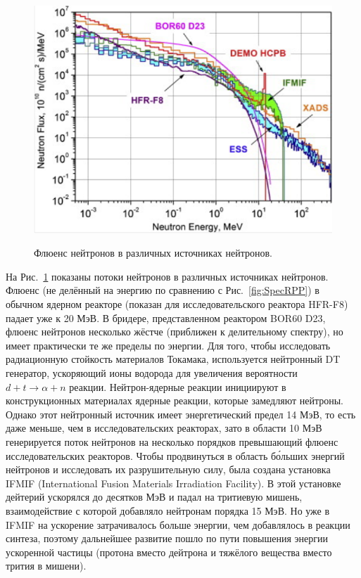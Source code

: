 \documentclass[a4paper,12pt]{article}
\begin{document}
\begin{large}
  \begin{figure}[ht]
    {
       \includegraphics[width=0.90\linewidth]{images/FusionReactors}
    }
    \caption{Флюенс нейтронов в различных источниках нейтронов.}
    \label{fig:FusReac}
  \end{figure}
  На Рис.~\ref{fig:FusReac} показаны потоки нейтронов в различных источниках нейтронов.
  Флюенс (не делённый на энергию по сравнению с Рис.~\ref{fig:SpecRPP}) в обычном ядерном реакторе (показан для исследовательского реактора HFR-F8) падает уже к 20 МэВ.
  В бридере, представленном реактором BOR60 D23, флюенс нейтронов несколько жёстче (приближен к делительному спектру), но имеет практически те же пределы по энергии.
  Для того, чтобы исследовать радиационную стойкость материалов Токамака, используется нейтронный DT генератор, ускоряющий ионы водорода для увеличения вероятности $d+t\rightarrow \alpha+n$ реакции.
  Нейтрон-ядерные реакции инициируют в конструкционных материалах ядерные реакции, которые замедляют нейтроны.
  Однако этот нейтронный источник имеет энергетический предел 14 МэВ, то есть даже меньше, чем в исследовательских реакторах, зато в области 10 МэВ генерируется поток нейтронов на несколько порядков превышающий флюенс исследовательских реакторов.
  Чтобы продвинуться в область б\'{о}льших энергий нейтронов и исследовать их разрушительную силу, была создана установка IFMIF (International Fusion Materials Irradiation Facility).
  В этой установке дейтерий ускорялся до десятков МэВ и падал на тритиевую мишень, взаимодействие с которой добавляло нейтронам порядка 15 МэВ.
  Но уже в IFMIF на ускорение затрачивалось больше энергии, чем добавлялось в реакции синтеза, поэтому дальнейшее развитие пошло по пути повышения энергии ускоренной частицы (протона вместо дейтрона и тяжёлого вещества вместо трития в мишени).

\end{large}
\end{document}
